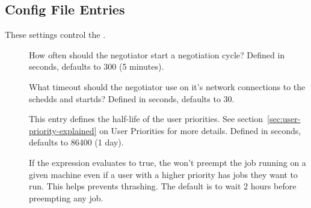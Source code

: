 \subsection{ Config File Entries}
\label{sec:Negotiator-Config-File-Entries}

These settings control the .

\begin{description}
  
\item[] \label{param:NegotiatorInterval}
  How often should the negotiator start a negotiation cycle?  Defined
  in seconds, defaults to 300 (5 minutes).
  
\item[] \label{param:NegotiatorTimeout}
  What timeout should the negotiator use on it's network connections
  to the schedds and startds?  Defined in seconds, defaults to 30.
  
\item[] \label{param:PriorityHalfLife} This
  entry defines the half-life of the user priorities.  See
  section~\ref{sec:user-priority-explained}
  on User Priorities for more details.  Defined in seconds, defaults
  to 86400 (1 day).
  
\item[] \label{param:PreemptionHold} If the
   expression evaluates to true, the
   won't preempt the job running on a given machine
  even if a user with a higher priority has jobs they want to run.
  This helps prevents thrashing.  The default is to wait 2 hours
  before preempting any job.

\end{description}
